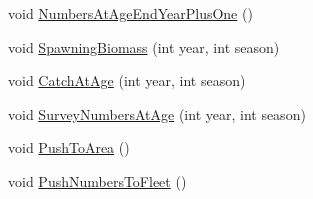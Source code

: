 \begin{DoxyCompactItemize}
void \hyperlink{structmas_1_1_area_population_info_a16235cc8c7e6d08f4b3581c49e07eeba}{Numbers\-At\-Age\-End\-Year\-Plus\-One} ()
\item 
void \hyperlink{structmas_1_1_area_population_info_a493690d2feaebb0a0756181d72ac1db4}{Spawning\-Biomass} (int year, int season)
\item 
void \hyperlink{structmas_1_1_area_population_info_a44c2cff8a28b114f441cc1b421d13ba2}{Catch\-At\-Age} (int year, int season)
\item 
void \hyperlink{structmas_1_1_area_population_info_a2ee688f3fbe309d5be814eee7866a131}{Survey\-Numbers\-At\-Age} (int year, int season)
\item 
void \hyperlink{structmas_1_1_area_population_info_a9313eb325ac90089d3864766489dfdf8}{Push\-To\-Area} ()
\item 
void \hyperlink{structmas_1_1_area_population_info_afe6a1961af7bee73fb0b660c5f3ac358}{Push\-Numbers\-To\-Fleet} ()
\end{DoxyCompactItemize}
